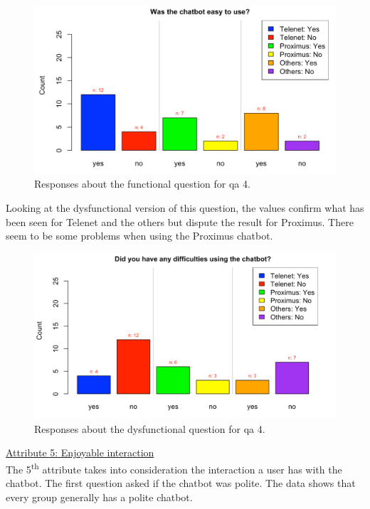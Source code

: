 \begin{figure}[!htb]
	\includegraphics[width=\linewidth, scale=0.5]{../LaTeX/Figures/Comparative/Q4.png}
	\caption{Responses about the functional question for \acrshort{qa} 4.}\label{fig:Q4}
\end{figure}
Looking at the dysfunctional version of this question, the values confirm what has been seen for Telenet and the others but dispute the result for Proximus. There seem to be some problems when using the Proximus chatbot.\\
\begin{figure}[!htb]
	\includegraphics[width=\linewidth, scale=0.5]{../LaTeX/Figures/Comparative/DQ4.png}
	\caption{Responses about the dysfunctional question for \acrshort{qa} 4.}\label{fig:DQ4}
\end{figure}
\break
\ul{Attribute 5: Enjoyable interaction}\\
\break
The 5\textsuperscript{th} attribute takes into consideration the interaction a user has with the chatbot. The first question asked if the chatbot was polite. The data shows that every group generally has a polite chatbot.\\
